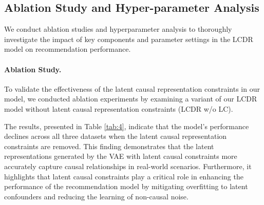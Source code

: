 \documentclass[sigconf]{acmart}
\begin{document}

\subsection{Ablation Study and Hyper-parameter Analysis} 

We conduct ablation studies and hyperparameter analysis to thoroughly investigate the impact of key components and parameter settings in the LCDR model on recommendation performance.


\paragraph{Ablation Study.}
To validate the effectiveness of the latent causal representation constraints in our model, we conducted ablation experiments by examining a variant of our LCDR model without latent causal representation constraints (LCDR w/o LC).

The results, presented in Table \ref{tab:4}, indicate that the model’s performance declines across all three datasets when the latent causal representation constraints are removed. This finding demonstrates that the latent representations generated by the VAE with latent causal constraints more accurately capture causal relationships in real-world scenarios. Furthermore, it highlights that latent causal constraints play a critical role in enhancing the performance of the recommendation model by mitigating overfitting to latent confounders and reducing the learning of non-causal noise.
 

\begin{table}[!t]
\centering
\caption{The ablation study of our LCDR method on three real-world datasets. The best results are in boldface, and the runner-up results are underlined.}
\label{tab:4}
\end{table}
\end{document}
